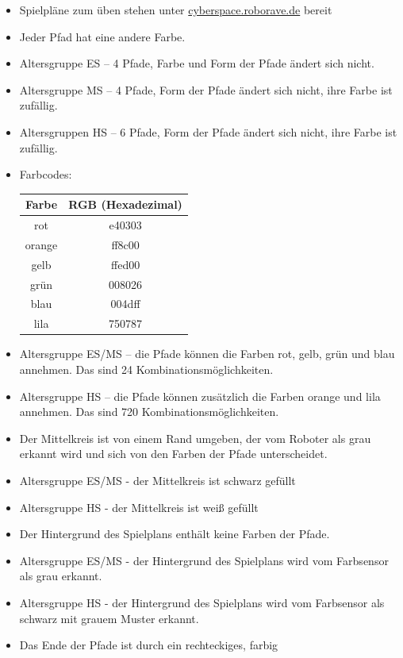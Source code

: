 \documentclass[a4paper,12pt]{article}
\begin{document}
\begin{itemize}
	\item Spielpläne zum üben stehen unter
\href{https://www.cyberspace.roborave.de/lab/}{cyberspace.roborave.de} bereit
	\item Jeder Pfad hat eine andere Farbe.
	\item Altersgruppe ES – 4 Pfade, Farbe und Form der Pfade ändert sich
	nicht.
	\item Altersgruppe MS – 4 Pfade, Form der Pfade ändert sich nicht,
	ihre Farbe ist zufällig.
	\item Altersgruppen HS – 6 Pfade, Form der Pfade ändert sich nicht,
	ihre Farbe ist zufällig.
	\item Farbcodes:
\begin{center}
	\begin{tabular}{|c|c|} \hline
		Farbe & RGB (Hexadezimal) \\ \hline
    		rot & e40303 \\
    		orange & ff8c00 \\
    		gelb & ffed00 \\
    		grün & 008026 \\
    		blau & 004dff \\
    		lila & 750787 \\ \hline
	\end{tabular}
\end{center}
	\item Altersgruppe ES/MS – die Pfade können die Farben rot, gelb, grün
		und blau annehmen. Das sind 24 Kombinationsmöglichkeiten.
	\item Altersgruppe HS – die Pfade können zusätzlich die Farben orange
		und lila annehmen. Das sind 720 Kombinationsmöglichkeiten.
	\item Der Mittelkreis ist von einem Rand umgeben, der vom Roboter als
		grau erkannt wird und sich von den Farben der Pfade
		unterscheidet.
	\item Altersgruppe ES/MS - der Mittelkreis ist schwarz gefüllt
	\item Altersgruppe HS - der Mittelkreis ist weiß gefüllt
	\item Der Hintergrund des Spielplans enthält keine Farben der Pfade.
	\item Altersgruppe ES/MS - der Hintergrund des Spielplans wird vom
		Farbsensor als grau erkannt.
	\item Altersgruppe HS - der Hintergrund des Spielplans wird vom
		Farbsensor als schwarz mit grauem Muster erkannt.
	\item Das Ende der Pfade ist durch ein rechteckiges, farbig

\end{itemize}
\end{document}
